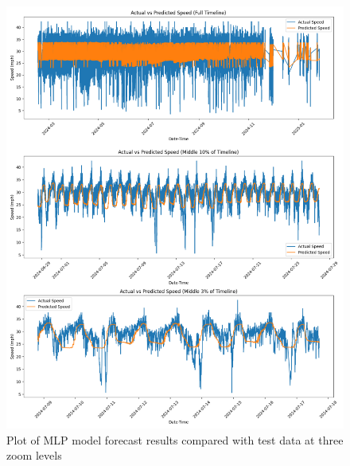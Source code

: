 \begin{figure}[!ht]
  \centering
  \includegraphics[width=\textwidth]{images/results-discussions/mlp-with-events.pdf}
  \caption{Plot of MLP model forecast results compared with test data at three zoom levels}
  \label{fig:mlp-with-events}
\end{figure}

